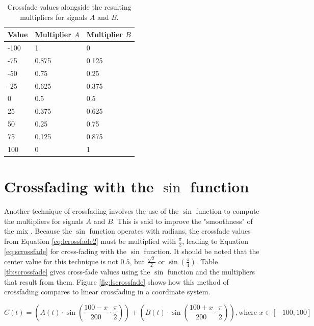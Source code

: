 \begin{table}[h!]

  \centering

  \begin{tabular}[]{| l | l | l |}
    \hline
    \rowcolor[gray]{0.8}
    Value & Multiplier $A$ & Multiplier $B$ \\\hline
    -100 & 1 & 0\\\hline
    -75 & 0.875 & 0.125\\\hline
    -50 & 0.75 & 0.25\\\hline
    -25 & 0.625 & 0.375\\\hline
    0 & 0.5 & 0.5\\\hline
    25 & 0.375 & 0.625\\\hline
    50 & 0.25 & 0.75\\\hline
    75 & 0.125 & 0.875\\\hline
    100 & 0 & 1\\
    \hline
  \end{tabular}

  \caption{Crossfade values alongside the resulting multipliers for signals $A$ and $B$.}

  \label{tb:lcrossfade}

\end{table}

\pagebreak

\section{Crossfading with the $\sin$ function}

Another technique of crossfading involves the use of the $\sin$ function to compute the multipliers for signals $A$ and $B$. This is said to improve the "smoothness" of the mix . Because the $\sin$ function operates with radians, the crossfade values from Equation \ref{eq:lcrossfade2} must be multiplied with $\frac{\pi}{2}$, leading to Equation \ref{eq:scrossfade} for cross-fading with the $\sin$ function. It should be noted that the center value for this technique is not $0.5$, but $\frac{\sqrt{2}}{2}$ or $\sin(\frac{\pi}{4})$. Table \ref{tb:scrossfade} gives cross-fade values using the $\sin$ function and the multipliers that result from them. Figure \ref{fig:lscrossfade} shows how this method of crossfading compares to linear crossfading in a coordinate system.

\begin{equation}
  C(t) = (A(t) \cdot \sin(\frac{100 - x}{200} \cdot \frac{\pi}{2})) + (B(t) \cdot \sin(\frac{100 + x}{200} \cdot \frac{\pi}{2})), \text{where } x \in [-100;100]
  \label{eq:scrossfade}
\end{equation}

